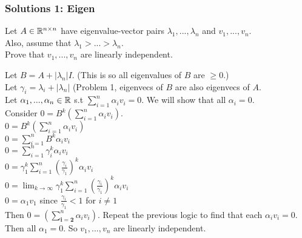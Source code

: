 \documentclass[table]{beamer}
\newcommand\fontten{\fontsize{10}{1.2}\selectfont}
\renewenvironment{enumerate}%
{\begin{list}{\arabic{enumi}.}%
      {\setlength{\leftmargin}{2.5em}%
       \setlength{\itemsep}{-\parsep}%
       \setlength{\topsep}{-\parskip}%
       \usecounter{enumi}}%
 }{\end{list}}
\begin{document}
\begin{frame}
\frametitle{Solutions 1: Eigen}

\begin{enumerate}

\item[3.] Let $A\in \mathbb{R}^{n \times n}$ have eigenvalue-vector pairs $\lambda_1,...,\lambda_n$ and $v_1,...,v_n$. \\
Also, assume that $\lambda_1>...>\lambda_n$.\\
Prove that $v_1,...,v_n$ are linearly independent.
\begin{solution}
\fontten
Let $B = A + |\lambda_n|I$. (This is so all eigenvalues of $B$ are $\geq 0$.) \\
Let $\gamma_i = \lambda_i+|\lambda_n|$
(Problem 1, eigenvecs of $B$ are also eigenvecs of $A$. \\
Let $\alpha_1,...,\alpha_n \in \mathbb{R}$ s.t $\sum_{i=1}^n \alpha_i v_i = 0$. We will show that all $\alpha_i=0$.\\
Consider $0 = B^k (\sum_{i=1}^n \alpha_i v_i)$. \\
\qquad $0 = B^k (\sum_{i=1}^n \alpha_i v_i)$ \\
\qquad $0 = \sum_{i=1}^n B^k \alpha_i v_i$ \\
\qquad $0 = \sum_{i=1}^n \gamma_i^k \alpha_i v_i$ \\ 
\qquad $0 = \gamma_1^k  \sum_{i=1}^n (\frac{\gamma_i}{\gamma_1})^k \alpha_i v_i$  \\ 
\qquad $0 = \lim_{k \rightarrow \infty} \gamma_1^k  \sum_{i=1}^n (\frac{\gamma_i}{\gamma_1})^k \alpha_i v_i$ \\
\qquad $0 = \alpha_1v_1$ \quad since $\frac{\gamma_i}{\gamma_1} < 1$ for $ i \neq 1$ \\
Then $0 = (\sum_{\mathbf{i=2}}^n \alpha_i v_i)$. Repeat the previous logic to find that each $\alpha_iv_i=0$. Then all $\alpha_1=0$. So $v_1,...,v_n$ are linearly independent. 
\end{solution}
\end{enumerate}
\end{frame}
\end{document}
